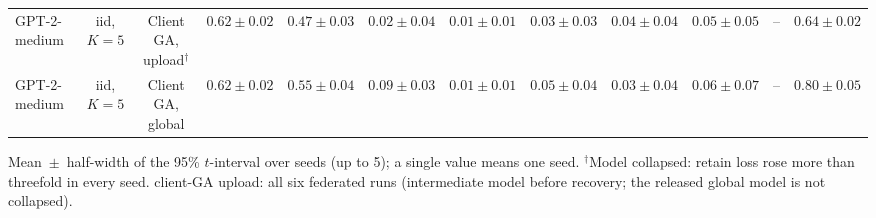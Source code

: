 {\begin{longtable}{@{\extracolsep{\fill}}lccccccccccc@{}}
GPT-2-medium & iid, $K=5$ & Client GA, upload$^{\dagger}$ & $0.62 \pm 0.02$ & $0.47 \pm 0.03$ & $0.02 \pm 0.04$ & $0.01 \pm 0.01$ & $0.03 \pm 0.03$ & $0.04 \pm 0.04$ & $0.05 \pm 0.05$ & -- & $0.64 \pm 0.02$ \\
GPT-2-medium & iid, $K=5$ & Client GA, global & $0.62 \pm 0.02$ & $0.55 \pm 0.04$ & $0.09 \pm 0.03$ & $0.01 \pm 0.01$ & $0.05 \pm 0.04$ & $0.03 \pm 0.04$ & $0.06 \pm 0.07$ & -- & $0.80 \pm 0.05$ \\
\end{longtable}
Mean~$\pm$~half-width of the 95\% $t$-interval over seeds (up to 5); a single value means one seed. $^{\dagger}$Model collapsed: retain loss rose more than threefold in every seed. client-GA upload: all six federated runs (intermediate model before recovery; the released global model is not collapsed).\par
}
